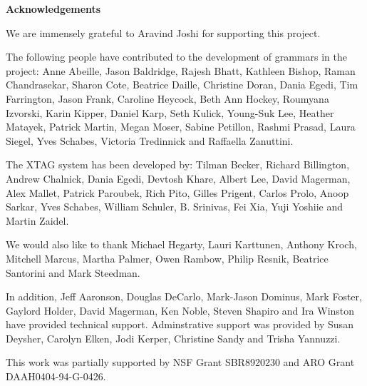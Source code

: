 \pagestyle{plain}
\null\vfil
\begin{center}
{\bf Acknowledgements}
\end{center}
\setcounter{page}{0}

We are immensely grateful to Aravind Joshi for supporting this
project. 

The following people have contributed to the development of grammars
in the project: Anne Abeille, Jason Baldridge, Rajesh Bhatt, Kathleen
Bishop, Raman Chandrasekar, Sharon Cote, Beatrice Daille, Christine
Doran, Dania Egedi, Tim Farrington, Jason Frank, Caroline Heycock,
Beth Ann Hockey, Roumyana Izvorski, Karin Kipper, Daniel Karp, Seth
Kulick, Young-Suk Lee, Heather Matayek, Patrick Martin, Megan Moser,
Sabine Petillon, Rashmi Prasad, Laura Siegel, Yves Schabes, Victoria
Tredinnick and Raffaella Zanuttini.

The XTAG system has been developed by: Tilman Becker, Richard
Billington, Andrew Chalnick, Dania Egedi, Devtosh Khare, Albert Lee,
David Magerman, Alex Mallet, Patrick Paroubek, Rich Pito, Gilles
Prigent, Carlos Prolo, Anoop Sarkar, Yves Schabes, William Schuler,
B. Srinivas, Fei Xia, Yuji Yoshiie and Martin Zaidel.

We would also like to thank Michael Hegarty, Lauri Karttunen, Anthony
Kroch, Mitchell Marcus, Martha Palmer, Owen Rambow, Philip Resnik,
Beatrice Santorini and Mark Steedman.

In addition, Jeff Aaronson, Douglas DeCarlo, Mark-Jason Dominus, Mark
Foster, Gaylord Holder, David Magerman, Ken Noble, Steven Shapiro and
Ira Winston have provided technical support.  Adminstrative support
was provided by Susan Deysher, Carolyn Elken, Jodi Kerper, Christine
Sandy and Trisha Yannuzzi.

This work was partially supported by  NSF Grant SBR8920230 and ARO Grant
DAAH0404-94-G-0426. 

\newpage

